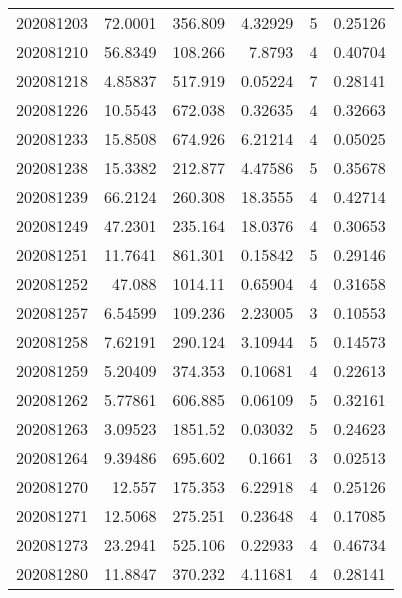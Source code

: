 \begin{tabular}{rrrrrr}
 202081203 &         72.0001  &      356.809  &            4.32929 &           5 & 0.25126 \\
 202081210 &         56.8349  &      108.266  &            7.8793  &           4 & 0.40704 \\
 202081218 &          4.85837 &      517.919  &            0.05224 &           7 & 0.28141 \\
 202081226 &         10.5543  &      672.038  &            0.32635 &           4 & 0.32663 \\
 202081233 &         15.8508  &      674.926  &            6.21214 &           4 & 0.05025 \\
 202081238 &         15.3382  &      212.877  &            4.47586 &           5 & 0.35678 \\
 202081239 &         66.2124  &      260.308  &           18.3555  &           4 & 0.42714 \\
 202081249 &         47.2301  &      235.164  &           18.0376  &           4 & 0.30653 \\
 202081251 &         11.7641  &      861.301  &            0.15842 &           5 & 0.29146 \\
 202081252 &         47.088   &     1014.11   &            0.65904 &           4 & 0.31658 \\
 202081257 &          6.54599 &      109.236  &            2.23005 &           3 & 0.10553 \\
 202081258 &          7.62191 &      290.124  &            3.10944 &           5 & 0.14573 \\
 202081259 &          5.20409 &      374.353  &            0.10681 &           4 & 0.22613 \\
 202081262 &          5.77861 &      606.885  &            0.06109 &           5 & 0.32161 \\
 202081263 &          3.09523 &     1851.52   &            0.03032 &           5 & 0.24623 \\
 202081264 &          9.39486 &      695.602  &            0.1661  &           3 & 0.02513 \\
 202081270 &         12.557   &      175.353  &            6.22918 &           4 & 0.25126 \\
 202081271 &         12.5068  &      275.251  &            0.23648 &           4 & 0.17085 \\
 202081273 &         23.2941  &      525.106  &            0.22933 &           4 & 0.46734 \\
 202081280 &         11.8847  &      370.232  &            4.11681 &           4 & 0.28141 \\

\end{tabular}
